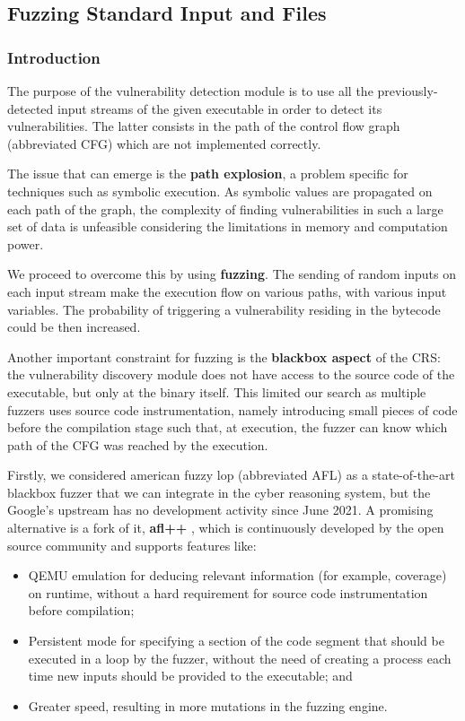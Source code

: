 \documentclass[12pt,a4paper,english,onecolumn]{IEEEtran}
\begin{document}
\subsection{Fuzzing Standard Input and Files}

\subsubsection{Introduction}

The purpose of the vulnerability detection module is to use all the previously-detected input streams of the given executable in order to detect its vulnerabilities. The latter consists in the path of the control flow graph (abbreviated CFG) which are not implemented correctly.

The issue that can emerge is the \textbf{path explosion}, a problem specific for techniques such as symbolic execution. As symbolic values are propagated on each path of the graph, the complexity of finding vulnerabilities in such a large set of data is unfeasible considering the limitations in memory and computation power.

We proceed to overcome this by using \textbf{fuzzing}. The sending of random inputs on each input stream make the execution flow on various paths, with various input variables. The probability of triggering a vulnerability residing in the bytecode could be then increased.

Another important constraint for fuzzing is the \textbf{blackbox aspect} of the CRS: the vulnerability discovery module does not have access to the source code of the executable, but only at the binary itself. This limited our search as multiple fuzzers uses source code instrumentation, namely introducing small pieces of code before the compilation stage such that, at execution, the fuzzer can know which path of the CFG was reached by the execution.

Firstly, we considered american fuzzy lop (abbreviated AFL) \cite{afl} as a state-of-the-art blackbox fuzzer that we can integrate in the cyber reasoning system, but the Google's upstream has no development activity since June 2021. A promising alternative is a fork of it, \textbf{afl++} \cite{aflplusplus}, which is continuously developed by the open source community and supports features like:
\begin{itemize}
    \item QEMU emulation for deducing relevant information (for example, coverage) on runtime, without a hard requirement for source code instrumentation before compilation;
    \item Persistent mode for specifying a section of the code segment that should be executed in a loop by the fuzzer, without the need of creating a process each time new inputs should be provided to the executable; and
    \item Greater speed, resulting in more mutations in the fuzzing engine.
\end{itemize}
\end{document}
